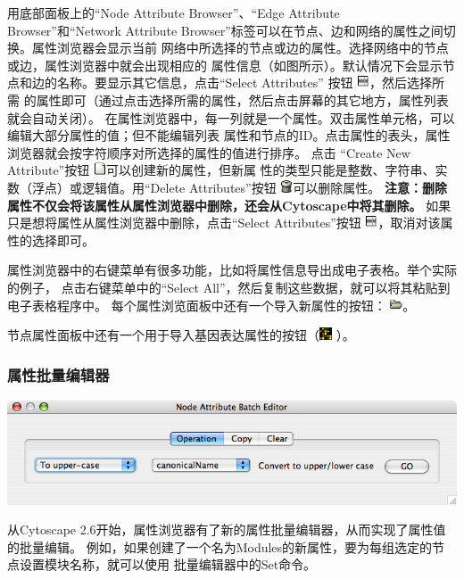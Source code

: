用底部面板上的``Node Attribute Browser''、``Edge Attribute Browser''和``Network
Attribute Browser''标签可以在节点、边和网络的属性之间切换。属性浏览器会显示当前
网络中所选择的节点或边的属性。选择网络中的节点或边，属性浏览器中就会出现相应的
属性信息（如图所示）。默认情况下会显示节点和边的名称。要显示其它信息，点击``Select
Attributes'' 按钮
\includegraphics[width=1em]{images/attributes_select_icon.png}，然后选择所需
的属性即可（通过点击选择所需的属性，然后点击屏幕的其它地方，属性列表就会自动关闭）。
在属性浏览器中，每一列就是一个属性。双击属性单元格，可以编辑大部分属性的值；但不能编辑列表
属性和节点的ID。点击属性的表头，属性浏览器就会按字符顺序对所选择的属性的值进行排序。
点击 ``Create New Attribute''按钮
\includegraphics[width=1em]{images/attributes_new_icon.png}可以创建新的属性，但新属
性的类型只能是整数、字符串、实数（浮点）或逻辑值。用``Delete Attributes''按钮
\includegraphics[width=1em]{images/attributes_delete_icon.png}可以删除属性。
\textbf{注意：删除属性不仅会将该属性从属性浏览器中删除，还会从Cytoscape中将其删除。}
如果只是想将属性从属性浏览器中删除，点击``Select Attributes''按钮
\includegraphics[width=1em]{images/attributes_select_icon.png}，取消对该属性的选择即可。

属性浏览器中的右键菜单有很多功能，比如将属性信息导出成电子表格。举个实际的例子，
点击右键菜单中的``Select All''，然后复制这些数据，就可以将其粘贴到电子表格程序中。
每个属性浏览面板中还有一个导入新属性的按钮：
\includegraphics[width=1em]{images/attributes_import_icon.png}。

节点属性面板中还有一个用于导入基因表达属性的按钮（\includegraphics[width=1em]{images/attributes_gene_expr_icon.png} ）。

\subsubsection{属性批量编辑器}
\includegraphics[width=.5\textwidth]{images/attribute_editor26.png} 

从Cytoscape 2.6开始，属性浏览器有了新的属性批量编辑器，从而实现了属性值的批量编辑。
例如，如果创建了一个名为Modules的新属性，要为每组选定的节点设置模块名称，就可以使用
批量编辑器中的Set命令。
